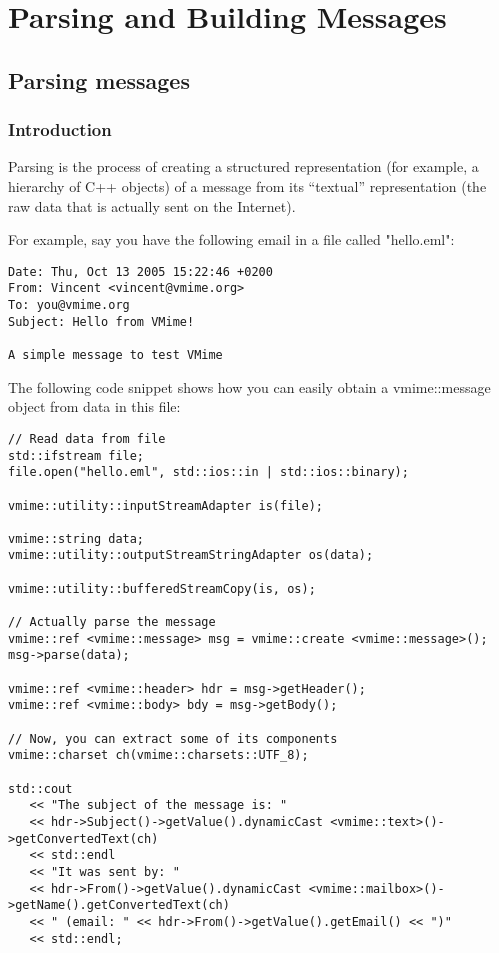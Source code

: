 \chapter{Parsing and Building Messages}

\section{Parsing messages}

\subsection{Introduction} %

Parsing is the process of creating a structured representation (for example,
a hierarchy of C++ objects) of a message from its ``textual'' representation
(the raw data that is actually sent on the Internet).

For example, say you have the following email in a file called "hello.eml":

\begin{verbatim}
Date: Thu, Oct 13 2005 15:22:46 +0200
From: Vincent <vincent@vmime.org>
To: you@vmime.org
Subject: Hello from VMime!

A simple message to test VMime
\end{verbatim}

The following code snippet shows how you can easily obtain a
{\vcode vmime::message} object from data in this file:

\begin{lstlisting}[caption={Parsing a message from a file}]
// Read data from file
std::ifstream file;
file.open("hello.eml", std::ios::in | std::ios::binary);

vmime::utility::inputStreamAdapter is(file);

vmime::string data;
vmime::utility::outputStreamStringAdapter os(data);

vmime::utility::bufferedStreamCopy(is, os);

// Actually parse the message
vmime::ref <vmime::message> msg = vmime::create <vmime::message>();
msg->parse(data);

vmime::ref <vmime::header> hdr = msg->getHeader();
vmime::ref <vmime::body> bdy = msg->getBody();

// Now, you can extract some of its components
vmime::charset ch(vmime::charsets::UTF_8);

std::cout
   << "The subject of the message is: "
   << hdr->Subject()->getValue().dynamicCast <vmime::text>()->getConvertedText(ch)
   << std::endl
   << "It was sent by: "
   << hdr->From()->getValue().dynamicCast <vmime::mailbox>()->getName().getConvertedText(ch)
   << " (email: " << hdr->From()->getValue().getEmail() << ")"
   << std::endl;
\end{lstlisting}

